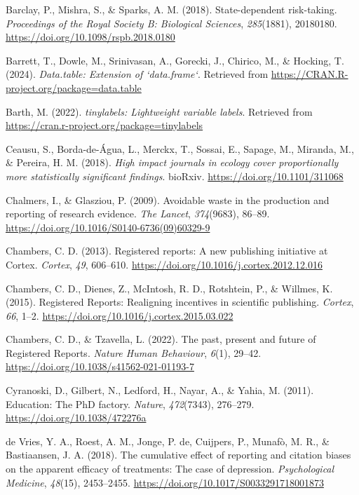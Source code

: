 \documentclass[
  british,
  a4paper,
  ,man,mask,floatsintext]{apa6}
\newlength{\cslhangindent}
\newenvironment{CSLReferences}[2] %
 {\begin{list}{}{%
  \setlength{\itemindent}{0pt}
  \setlength{\leftmargin}{0pt}
  \setlength{\parsep}{0pt}
  \ifodd #1
   \setlength{\leftmargin}{\cslhangindent}
   \setlength{\itemindent}{-1\cslhangindent}
  \fi
  \setlength{\itemsep}{#2\baselineskip}}}
 {\end{list}}
\begin{document}
\begin{CSLReferences}{1}{0}
Barclay, P., Mishra, S., \& Sparks, A. M. (2018). State-dependent risk-taking. \emph{Proceedings of the Royal Society B: Biological Sciences}, \emph{285}(1881), 20180180. \url{https://doi.org/10.1098/rspb.2018.0180}

Barrett, T., Dowle, M., Srinivasan, A., Gorecki, J., Chirico, M., \& Hocking, T. (2024). \emph{Data.table: Extension of `data.frame`}. Retrieved from \url{https://CRAN.R-project.org/package=data.table}

Barth, M. (2022). \emph{{tinylabels}: Lightweight variable labels}. Retrieved from \url{https://cran.r-project.org/package=tinylabels}

Ceausu, S., Borda-de-Água, L., Merckx, T., Sossai, E., Sapage, M., Miranda, M., \& Pereira, H. M. (2018). \emph{High impact journals in ecology cover proportionally more statistically significant findings}. bioRxiv. \url{https://doi.org/10.1101/311068}

Chalmers, I., \& Glasziou, P. (2009). Avoidable waste in the production and reporting of research evidence. \emph{The Lancet}, \emph{374}(9683), 86--89. \url{https://doi.org/10.1016/S0140-6736(09)60329-9}

Chambers, C. D. (2013). Registered reports: {A} new publishing initiative at {Cortex}. \emph{Cortex}, \emph{49}, 606--610. \url{https://doi.org/10.1016/j.cortex.2012.12.016}

Chambers, C. D., Dienes, Z., McIntosh, R. D., Rotshtein, P., \& Willmes, K. (2015). Registered {Reports}: {Realigning} incentives in scientific publishing. \emph{Cortex}, \emph{66}, 1--2. \url{https://doi.org/10.1016/j.cortex.2015.03.022}

Chambers, C. D., \& Tzavella, L. (2022). The past, present and future of {Registered Reports}. \emph{Nature Human Behaviour}, \emph{6}(1), 29--42. \url{https://doi.org/10.1038/s41562-021-01193-7}

Cyranoski, D., Gilbert, N., Ledford, H., Nayar, A., \& Yahia, M. (2011). Education: {The PhD} factory. \emph{Nature}, \emph{472}(7343), 276--279. \url{https://doi.org/10.1038/472276a}

de Vries, Y. A., Roest, A. M., Jonge, P. de, Cuijpers, P., Munafò, M. R., \& Bastiaansen, J. A. (2018). The cumulative effect of reporting and citation biases on the apparent efficacy of treatments: The case of depression. \emph{Psychological Medicine}, \emph{48}(15), 2453--2455. \url{https://doi.org/10.1017/S0033291718001873}


\end{CSLReferences}
\end{document}

